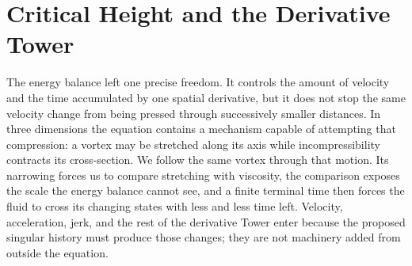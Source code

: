 \section{Critical Height and the Derivative Tower}\label{sec:CriticalHeightAndDerivativeTower}

The energy balance left one precise freedom.  It controls the amount of
velocity and the time accumulated by one spatial derivative, but it does not
stop the same velocity change from being pressed through successively smaller
distances.  In three dimensions the equation contains a mechanism capable of
attempting that compression: a vortex may be stretched along its axis while
incompressibility contracts its cross-section.  We follow the same vortex
through that motion.  Its narrowing forces us to compare stretching with
viscosity, the comparison exposes the scale the energy balance cannot see,
and a finite terminal time then forces the fluid to cross its changing states
with less and less time left.  Velocity, acceleration, jerk, and the rest of
the derivative Tower enter because the proposed singular history must produce
those changes; they are not machinery added from outside the equation.





